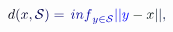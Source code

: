 \documentclass[12pt]{article}
\begin{document}
\makeatletter
\renewcommand*{\@textcolor}[3]{%
  \protect\leavevmode
  \begingroup
    \color#1{#2}#3%
  \endgroup
}
\makeatother
\begin{displaymath}
\mathcolor[RGB]{0,0,15}{d} \mathcolor[RGB]{0,0,30}{(} \mathcolor[RGB]{0,0,45}{x} \mathcolor[RGB]{0,0,60}{,} \mathcal { \mathcolor[RGB]{0,0,75}{S} } \mathcolor[RGB]{0,0,90}{)} \mathcolor[RGB]{0,0,105}{=} \mathcolor[RGB]{0,0,120}{\operatorname*} { \mathcolor[RGB]{0,0,135}{i} \mathcolor[RGB]{0,0,150}{n} \mathcolor[RGB]{0,0,165}{f} } _ { \mathcolor[RGB]{0,0,180}{y} \mathcolor[RGB]{0,0,195}{\in} \mathcal { \mathcolor[RGB]{0,0,210}{S} } } \mathcolor[RGB]{0,0,225}{|} \mathcolor[RGB]{0,0,240}{|} \mathcolor[RGB]{0,0,255}{y} \mathcolor[RGB]{0,15,0}{-} \mathcolor[RGB]{0,15,15}{x} \mathcolor[RGB]{0,15,30}{|} \mathcolor[RGB]{0,15,45}{|} \mathcolor[RGB]{0,15,60}{,}
\end{displaymath}
\end{document}
